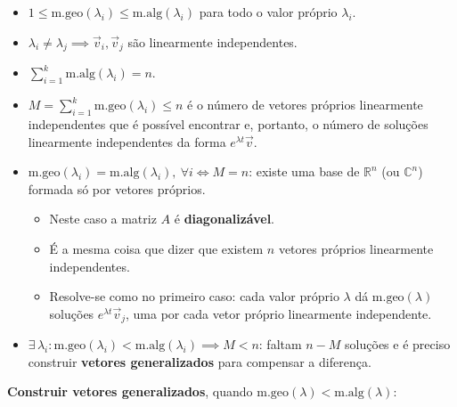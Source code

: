 \documentclass{article}
\begin{document}
\begin{itemize}
    \item $\boxed{1 \leq \text{m.geo}(\lambda_i) \leq \text{m.alg}(\lambda_i)}$
    para todo o valor próprio $\lambda_i$.
    \item $\lambda_i \neq \lambda_j \implies \vec{v}_i, \vec{v}_j$ são linearmente independentes.
    \item $\sum_{i=1}^{k} \text{m.alg}(\lambda_i) = n$.
    \item $M = \sum_{i=1}^{k} \text{m.geo}(\lambda_i) \leq n$ é o número de vetores próprios
    linearmente independentes que é possível encontrar e, portanto, o número de soluções linearmente
    independentes da forma $e^{\lambda t}\vec{v}$.
    \item $\boxed{\text{m.geo}(\lambda_i) = \text{m.alg}(\lambda_i), \ \forall i
    \iff M = n}$: existe uma base de $\mathbb{R}^n$ (ou $\mathbb{C}^n$) formada só por vetores próprios.
    \begin{itemize}
        \item Neste caso a matriz $A$ é \textbf{diagonalizável}.
        \item É a mesma coisa que dizer que existem $n$ vetores próprios linearmente independentes.
        \item Resolve-se como no primeiro caso: cada valor próprio $\lambda$ dá $\text{m.geo}(\lambda)$
        soluções $e^{\lambda t}\vec{v}_j$, uma por cada vetor próprio linearmente independente.
    \end{itemize}
    \item $\boxed{\exists \, \lambda_i : \text{m.geo}(\lambda_i) < \text{m.alg}(\lambda_i)
    \implies M < n}$: faltam $n - M$ soluções e é preciso construir \textbf{vetores generalizados} para
    compensar a diferença.
\end{itemize}

\smallskip

\textbf{Construir vetores generalizados}, quando $\text{m.geo}(\lambda) < \text{m.alg}(\lambda)$:
\end{document}
